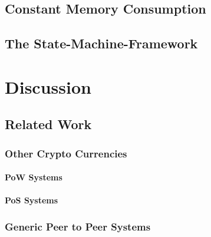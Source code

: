 \documentclass{report}
\theoremstyle{definition}{
  \newtheorem{lemma}{Lemma}[section] %
  \newtheorem{definition}[lemma]{Definition}
}
\theoremstyle{theorem}{
  \newtheorem{invariant}[lemma]{Invariant}
  \newtheorem{proofobligation}[lemma]{Proof Obligation}
}
\numberwithin{equation}{lemma}
\begin{document}
\section{Constant Memory Consumption}
\section{The State-Machine-Framework}
\label{Haskell-state-machine}

\chapter{Discussion}
\section{Related Work}
\subsection{Other Crypto Currencies}
\subsubsection{PoW Systems}
\subsubsection{PoS Systems}
\subsection{Generic Peer to Peer Systems}
\end{document}
